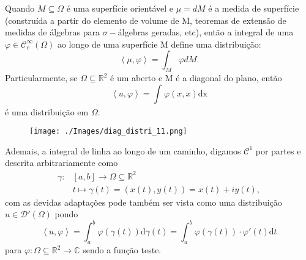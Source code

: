 \documentclass[../distribution_theory_notes.tex]{subfiles}
\begin{document}
\begin{example}
	Quando \(M\subseteq \Omega \) é uma superfície orientável e \(\mu =dM\) é a medida de superfície (construída a partir do elemento de volume de M, teoremas de extensão de medidas de álgebras para \(\sigma-\)álgebras geradas, etc), então a integral de uma \(\varphi \in \mathcal{C}_{c}^{\infty}(\Omega )\) ao longo de uma superfície M define uma distribuição:
	\[
		\left< \mu , \varphi  \right>=\int_{M}\varphi  dM.
	\]
	Particularmente, se \(\Omega \subseteq \mathbb{R}^{2}\) é um aberto e M é a diagonal do plano, então
	\[
		\left< u, \varphi  \right>= \int_{}^{}\varphi (x, x) \mathrm{dx}
	\]
	é uma distribuição em \(\Omega \).
	\begin{figure}[H]
		\begin{center}
			\texttt{[image: ./Images/diag\_distri\_11.png]}
		\end{center}
	\end{figure}

	Ademais, a integral de linha ao longo de um caminho, digamos \(\mathcal{C}^{1}\) por partes e descrita arbitrariamente como
	\begin{align*}
		\gamma: & [a, b]\rightarrow \Omega \subseteq \mathbb{R}^{2}  \\
		        & t\longmapsto \gamma (t)=(x(t), y(t)) = x(t)+iy(t),
	\end{align*}
	com as devidas adaptações pode também ser vista como uma distribuição \(u\in \mathcal{D}'(\Omega )\) pondo
	\[
		\left< u, \varphi  \right> = \int_{a}^{b}\varphi (\gamma (t)) \mathrm{d}\gamma (t) = \int_{a}^{b}\varphi (\gamma (t))\cdot \varphi'(t)\mathrm{d}t
	\]
	para \(\varphi :\Omega  \subseteq \mathbb{R}^{2}\rightarrow \mathbb{C}\) sendo a função teste.
\end{example}
\end{document}
